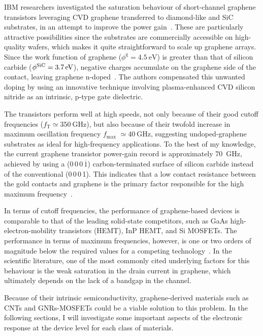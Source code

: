 IBM researchers investigated the saturation behaviour of short-channel graphene transistors leveraging CVD graphene transferred to diamond-like and SiC substrates, in an attempt to improve the power gain~\cite{wu2012state}. These are particularly attractive possibilities since the substrates are commercially accessible on high-quality wafers, which makes it quite straightforward to scale up graphene arrays. Since the work function of graphene ($\phi^\textrm{g} = \SI{4.5}{\electronvolt}$) is greater than that of silicon carbide ($\phi^{\ce{SiC}} = \SI{3.7}{\electronvolt}$), negative charges accumulate on the graphene side of the contact, leaving graphene n-doped~\cite{sonde2009electrical}. The authors compensated this unwanted doping by using an innovative technique involving plasma-enhanced CVD silicon nitride as an intrinsic, p-type gate dielectric.

The transistors perform well at high speeds, not only because of their good cutoff frequencies ($f_\textrm{T}\simeq \SI{350}{\giga\hertz}$), but also because of their twofold increase in maximum oscillation frequency  $f_\textrm{max}$ $\simeq\SI{40}{\giga\hertz}$, suggesting undoped-graphene substrates as ideal for high-frequency applications. To the best of my knowledge, the current graphene transistor power-gain record is approximately \SI{70}{\giga\hertz}, achieved by using a ($0\,0\,0\,\overline{1}$) carbon-terminated surface of silicon carbide instead of the conventional (0\,0\,0\,1). This indicates that a low contact resistance between the gold contacts and graphene is the primary factor responsible for the high maximum frequency~\cite{guo2013record}.

In terms of cutoff frequencies, the performance of graphene-based devices is comparable to that of the leading solid-state competitors, such as GaAs high-electron-mobility transistors (HEMT), InP HEMT, and Si \glspl{MOSFET}. The performance in terms of maximum frequencies, however, is one or two orders of magnitude below the required values for a competing technology~\cite{tan1990InGaAs, post2006RF,lai2007sub}. In the scientific literature, one of the most commonly cited underlying factors for this behaviour is the weak saturation in the drain current in graphene, which ultimately depends on the lack of a bandgap in the channel.

Because of their intrinsic semiconductivity, graphene-derived materials such as \glspl{CNT} and \glspl{GNR}-\glspl{MOSFET} could be a viable solution to this problem. In the following sections, I will investigate some important aspects of the electronic response at the device level for each class of materials.

